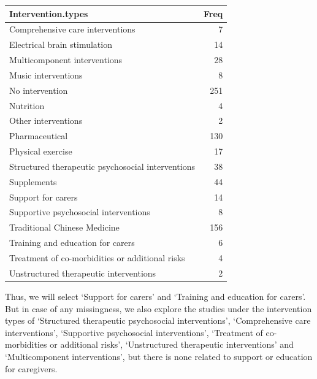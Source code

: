 \documentclass[
]{article}
\newenvironment{Shaded}{\begin{snugshade}}{\end{snugshade}}
\newcommand{\FunctionTok}[1]{\textcolor[rgb]{0.00,0.00,0.00}{#1}}
\newcommand{\NormalTok}[1]{#1}
\newcommand{\OtherTok}[1]{\textcolor[rgb]{0.56,0.35,0.01}{#1}}
\newcommand{\SpecialCharTok}[1]{\textcolor[rgb]{0.00,0.00,0.00}{#1}}
\newcommand{\StringTok}[1]{\textcolor[rgb]{0.31,0.60,0.02}{#1}}
\begin{document}
\begin{longtable}[]{@{}lr@{}}
\toprule()
Intervention.types & Freq \\
\midrule()
\endhead
Comprehensive care interventions & 7 \\
Electrical brain stimulation & 14 \\
Multicomponent interventions & 28 \\
Music interventions & 8 \\
No intervention & 251 \\
Nutrition & 4 \\
Other interventions & 2 \\
Pharmaceutical & 130 \\
Physical exercise & 17 \\
Structured therapeutic psychosocial interventions & 38 \\
Supplements & 44 \\
Support for carers & 14 \\
Supportive psychosocial interventions & 8 \\
Traditional Chinese Medicine & 156 \\
Training and education for carers & 6 \\
Treatment of co-morbidities or additional risks & 4 \\
Unstructured therapeutic interventions & 2 \\
\bottomrule()
\end{longtable}

Thus, we will select `Support for carers' and `Training and education
for carers'. But in case of any missingness, we also explore the studies
under the intervention types of `Structured therapeutic psychosocial
interventions', `Comprehensive care interventions', `Supportive
psychosocial interventions', `Treatment of co-morbidities or additional
risks', `Unstructured therapeutic interventions' and `Multicomponent
interventions', but there is none related to support or education for
caregivers.

\begin{Shaded}
\end{Shaded}
\end{document}
